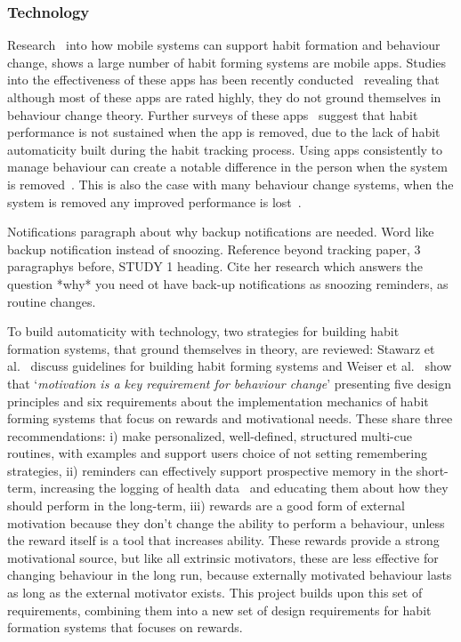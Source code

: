 \subsubsection*{Technology}
Research~\cite{survey_on_apps_2,survey_on_current_apps_of_steel} into how mobile systems can support habit formation and behaviour change, shows a large number of habit forming systems are mobile apps. Studies into the effectiveness of these apps has been recently conducted~\cite{article_beyond_self_tracking_designing_apps, article_dont_kick_habit} revealing that although most of these apps are rated highly, they do not ground themselves in behaviour change theory. Further surveys of these apps~\cite{survey_on_current_apps_of_steel,survey_on_apps_2} suggest that habit performance is not sustained when the app is removed, due to the lack of habit automaticity built during the habit tracking process. Using apps consistently to manage behaviour can create a notable difference in the person when the system is removed~\cite{article_my_phone_is_part_of_my_soul}. This is also the case with many behaviour change systems, when the system is removed any improved performance is lost~\cite{article_dont_kick_habit, article_realtime_feedback_improving_medication_taking}.


Notifications paragraph about why backup notifications are needed. Word like backup notification instead of snoozing. Reference beyond tracking paper, 3 paragraphys before, STUDY 1 heading. Cite her research which answers the question *why* you need ot have back-up notifications as snoozing reminders, as routine changes.


To build automaticity with technology, two strategies for building habit formation systems, that ground themselves in theory, are reviewed: Stawarz et al.~\cite{article_beyond_self_tracking_designing_apps} discuss guidelines for building habit forming systems and Weiser et al.~\cite{article_taxonomy_motivational_affordances_meaningful} show that `\textit{motivation is a key requirement for behaviour change}' presenting five design principles and six requirements about the implementation mechanics of habit forming systems that focus on rewards and motivational needs. These share three recommendations: i) make personalized, well-defined, structured multi-cue routines, with examples and support users choice of not setting remembering strategies, ii) reminders can effectively support prospective memory in the short-term, increasing the logging of health data~\cite{the_power_of_logging_mobile_notifications} and educating them about how they should perform in the long-term, iii) rewards are a good form of external motivation because they don't change the ability to perform a behaviour, unless the reward itself is a tool that increases ability. These rewards provide a strong motivational source, but like all extrinsic motivators, these are less effective for changing behaviour in the long run, because externally motivated behaviour lasts as long as the external motivator exists. This project builds upon this set of requirements, combining them into a new set of design requirements for habit formation systems that focuses on rewards.

